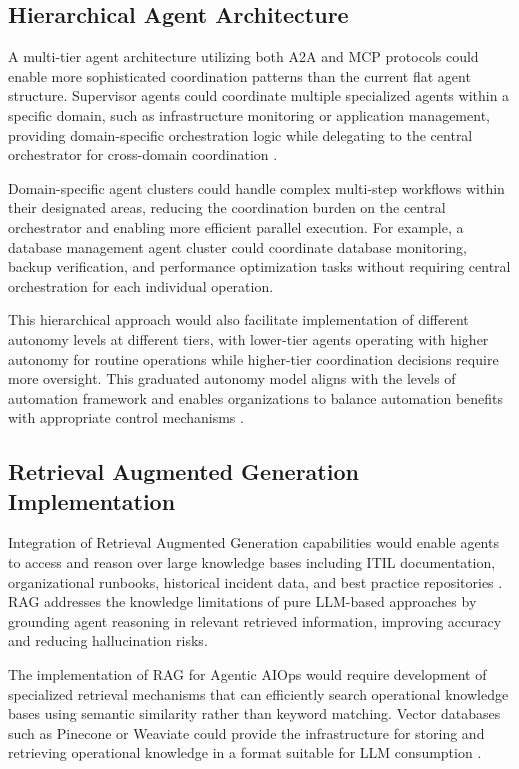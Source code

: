 \documentclass{article}
\begin{document}
\subsection{Hierarchical Agent Architecture}

A multi-tier agent architecture utilizing both A2A and MCP protocols could enable more sophisticated coordination patterns than the current flat agent structure. Supervisor agents could coordinate multiple specialized agents within a specific domain, such as infrastructure monitoring or application management, providing domain-specific orchestration logic while delegating to the central orchestrator for cross-domain coordination \cite{piccialli2025}.

Domain-specific agent clusters could handle complex multi-step workflows within their designated areas, reducing the coordination burden on the central orchestrator and enabling more efficient parallel execution. For example, a database management agent cluster could coordinate database monitoring, backup verification, and performance optimization tasks without requiring central orchestration for each individual operation.

This hierarchical approach would also facilitate implementation of different autonomy levels at different tiers, with lower-tier agents operating with higher autonomy for routine operations while higher-tier coordination decisions require more oversight. This graduated autonomy model aligns with the levels of automation framework and enables organizations to balance automation benefits with appropriate control mechanisms \cite{gulenko2020}.

\subsection{Retrieval Augmented Generation Implementation}

Integration of Retrieval Augmented Generation capabilities would enable agents to access and reason over large knowledge bases including ITIL documentation, organizational runbooks, historical incident data, and best practice repositories \cite{lewis2020}. RAG addresses the knowledge limitations of pure LLM-based approaches by grounding agent reasoning in relevant retrieved information, improving accuracy and reducing hallucination risks.

The implementation of RAG for Agentic AIOps would require development of specialized retrieval mechanisms that can efficiently search operational knowledge bases using semantic similarity rather than keyword matching. Vector databases such as Pinecone or Weaviate could provide the infrastructure for storing and retrieving operational knowledge in a format suitable for LLM consumption \cite{pinecone2024}.
\end{document}
